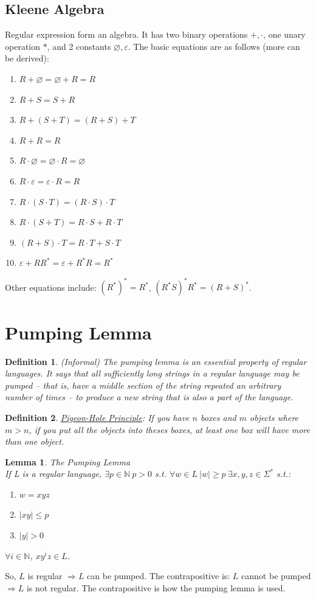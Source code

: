 \documentclass{article}
\newtheorem{definition}{Definition}
\newtheorem{lemma}{Lemma}
\begin{document}
\subsection{Kleene Algebra}
Regular expression form an algebra. It has two binary operations $+, \cdot$, one unary operation $*$, and 2 constants $\varnothing, \varepsilon$. The basic equations are as follows (more can be derived):
\begin{enumerate}
    \item $R+\varnothing = \varnothing + R = R$
    \item $R+S = S+R$
    \item $R + (S+T) = (R+S) +T$
    \item $R+R = R$
    \item $R\cdot\varnothing = \varnothing \cdot R = \varnothing$
    \item $R\cdot\varepsilon = \varepsilon \cdot R = R$
    \item $R\cdot(S \cdot T) = (R \cdot S) \cdot T$
    \item $R \cdot (S + T) = R \cdot S + R \cdot T$
    \item $(R+S) \cdot T = R \cdot T + S \cdot T$
    \item $\varepsilon + RR^* = \varepsilon + R^*R = R^*$
\end{enumerate}
Other equations include: $(R^*)^* = R^*$, $(R^*S)^*R^* = (R+S)^*$.
\section{Pumping Lemma}
\begin{definition}
(Informal) The pumping lemma is an essential property of regular languages. It says that all sufficiently long strings in a regular language may be pumped -- that is, have a middle section of the string repeated an arbitrary number of times -- to produce a new string that is also a part of the language.
\end{definition}
\begin{definition}
\underline{Pigeon-Hole Principle}: If you have $n$ boxes and $m$ objects where $m > n$, if you put all the objects into theses boxes, at least one box will have more than one object.
\end{definition}
\begin{lemma}
The Pumping Lemma\\
If L is a regular language, $\exists p \in \mathbb{N}\ p > 0$ s.t. $\forall w \in L\ |w| \geq p\ \exists x,y,z \in \Sigma^*$ s.t.:
\begin{enumerate}
    \item $w = xyz$
    \item $|xy| \leq p$
    \item $|y| > 0$
\end{enumerate}
$\forall i \in \mathbb{N}$, $xy^iz \in L$.
\end{lemma}
\noindent So, $L$ is regular $\Rightarrow L$ can be pumped. The contrapositive is: $L$ cannot be pumped $\Rightarrow L$ is not regular. The contrapositive is how the pumping lemma is used.
\end{document}
